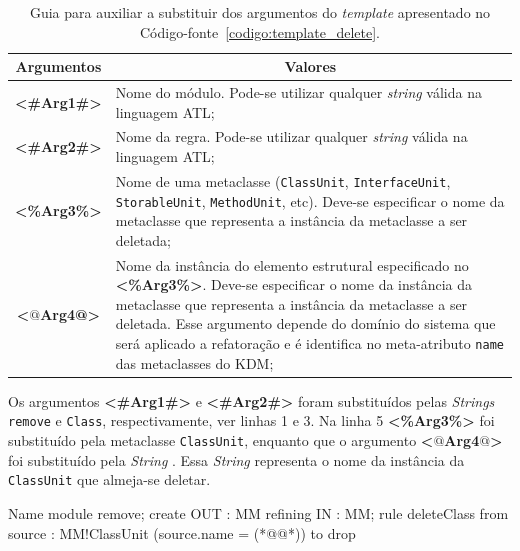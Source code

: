 \begin{table}[h]
\centering
\caption{Guia para auxiliar a substituir dos argumentos do \textit{template} apresentado no Código-fonte~\ref{codigo:template_delete}.}
\label{tab:guia_template_operacao_delete}
\begin{tabular}{ | m{1.7cm} | m{12cm}| } 
\hline
\multicolumn{1}{|c|}{Argumentos}                                         & \multicolumn{1}{c|}{Valores} \\ \hline
\multicolumn{1}{|c|}{\textbf{<\#Arg1\#>}} & Nome do módulo. Pode-se utilizar qualquer \textit{string} válida na linguagem ATL; \\ 
\hline
\multicolumn{1}{|c|}{\textbf{<\#Arg2\#>}} & Nome da regra. Pode-se utilizar qualquer \textit{string} válida na linguagem ATL; \\  
\hline
\multicolumn{1}{|c|}{\textbf{<\%Arg3\%>}} & Nome de uma metaclasse (\texttt{ClassUnit}, \texttt{InterfaceUnit}, \texttt{StorableUnit}, \texttt{MethodUnit}, etc). Deve-se especificar o nome da metaclasse que representa a instância da metaclasse a ser deletada; \\ 
\hline
\multicolumn{1}{|c|}{\textbf{<$@$Arg4@>}} & Nome da instância do elemento estrutural especificado no \textbf{<\%Arg3\%>}. Deve-se especificar o nome da instância da metaclasse que representa a instância da metaclasse a ser deletada. Esse argumento depende do domínio do sistema que será aplicado a refatoração e é identifica no meta-atributo \texttt{name} das metaclasses do KDM;  \\ 
\hline
\end{tabular}
\end{table}

Os argumentos \textbf{<\#Arg1\#>} e \textbf{<\#Arg2\#>} foram substituídos pelas \textit{Strings} \texttt{remove} e \texttt{Class}, respectivamente, ver linhas 1 e 3. Na linha 5 \textbf{<\%Arg3\%>} foi substituído pela metaclasse \texttt{ClassUnit}, enquanto que o argumento \textbf{<$@$Arg4$@$>} foi substituído pela \textit{String} \texttt{}. Essa \textit{String} representa o nome da instância da \texttt{ClassUnit} que almeja-se deletar.


\begin{codigo}[caption={[ATL para realizar a operação atômica \texttt{delete} \texttt{ClassUnit}.] ATL para realizar a operação atômica \texttt{delete} \texttt{ClassUnit}.},escapeinside={(*@}{@*)}, basicstyle=\footnotesize, label={codigo:exemplo_delete_classUnit}, language=ATL]{Name}
module remove;
create OUT : MM refining IN : MM;
rule deleteClass {
  from
      source : MM!ClassUnit (source.name = (*@@*))
  to
      drop
}
\end{codigo}

